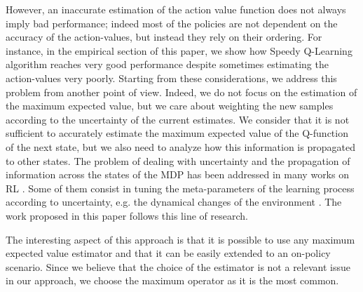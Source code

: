 \documentclass[conference]{IEEEtran}
\begin{document}
However, an inaccurate estimation of the action value function does not always imply bad performance; indeed most of the policies are not dependent on the accuracy of the action-values, but instead they rely on their ordering. For instance, in the empirical section of this paper, we show how Speedy Q-Learning algorithm \cite{NIPS2011_4251} reaches very good performance despite sometimes estimating the action-values very poorly. Starting from these considerations, we address this problem from another point of view. Indeed, we do not focus on the estimation of the maximum expected value, but we care about weighting the new samples according to the uncertainty of the current estimates. 
We consider that it is not sufficient to accurately estimate the maximum expected value of the Q-function of the next state, but we also need to analyze how this information is propagated to other states. The problem of dealing with uncertainty and the propagation of information across the states of the MDP has been addressed in many works on RL \cite{mohagheghi2007proportional, Tewari2007}. Some of them consist in tuning the meta-parameters of the learning process according to uncertainty, e.g. the dynamical changes of the environment \cite{schweighofer2003meta, Kobayashi2009, yoshida2013reinforcement}.
The work proposed in this paper follows this line of research.

The interesting aspect of this approach is that it is possible to use any maximum expected value estimator and that it can be easily extended to an on-policy scenario. Since we believe that the choice of the estimator is not a relevant issue in our approach, we choose the maximum operator as it is the most common.
\end{document}
